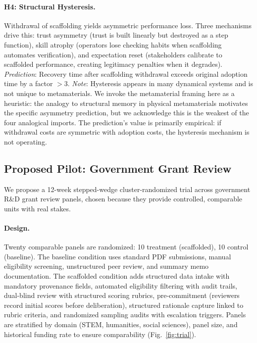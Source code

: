 \documentclass[runningheads]{llncs}
\begin{document}
\paragraph{H4: Structural Hysteresis.}
Withdrawal of scaffolding yields asymmetric performance loss. Three mechanisms drive this: trust asymmetry (trust is built linearly but destroyed as a step function), skill atrophy (operators lose checking habits when scaffolding automates verification), and expectation reset (stakeholders calibrate to scaffolded performance, creating legitimacy penalties when it degrades). \emph{Prediction}: Recovery time after scaffolding withdrawal exceeds original adoption time by a factor $>3$. \emph{Note}: Hysteresis appears in many dynamical systems and is not unique to metamaterials. We invoke the metamaterial framing here as a heuristic: the analogy to structural memory in physical metamaterials motivates the specific asymmetry prediction, but we acknowledge this is the weakest of the four analogical imports. The prediction's value is primarily empirical: if withdrawal costs are symmetric with adoption costs, the hysteresis mechanism is not operating.

\subsection{Proposed Pilot: Government Grant Review}

We propose a 12-week stepped-wedge cluster-randomized trial across government R\&D grant review panels, chosen because they provide controlled, comparable units with real stakes.

\paragraph{Design.}
Twenty comparable panels are randomized: 10 treatment (scaffolded), 10 control (baseline). The baseline condition uses standard PDF submissions, manual eligibility screening, unstructured peer review, and summary memo documentation. The scaffolded condition adds structured data intake with mandatory provenance fields, automated eligibility filtering with audit trails, dual-blind review with structured scoring rubrics, pre-commitment (reviewers record initial scores before deliberation), structured rationale capture linked to rubric criteria, and randomized sampling audits with escalation triggers. Panels are stratified by domain (STEM, humanities, social sciences), panel size, and historical funding rate to ensure comparability (Fig.~\ref{fig:trial}).
\end{document}
